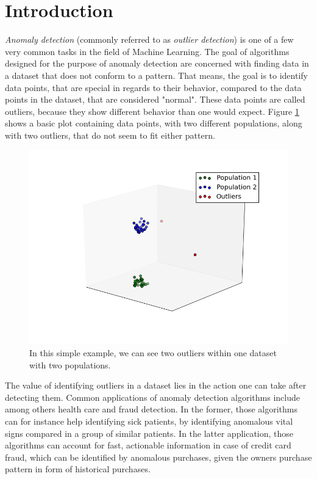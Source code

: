 \documentclass{vldb}
\begin{document}
\section{Introduction}
\label{sec:Introduction}
\textit{Anomaly detection} (commonly referred to as \textit{outlier detection}) is one of a few very common tasks in the field of Machine Learning. The goal of algorithms designed for the purpose of anomaly detection are concerned with finding data in a dataset that does not conform to a pattern. That means, the goal is to identify data points, that are special in regards to their behavior, compared to the data points in the dataset, that are considered "normal". \cite{survey:anomaly-detection} These data points are called outliers, because they show different behavior than one would expect. Figure \ref{fig:outlier-basic} shows a basic plot containing data points, with two different populations, along with two outliers, that do not seem to fit either pattern.\\
\begin{figure}
\centering
\includegraphics[width=\linewidth]{"pics/outlier_basic"}%
\caption{In this simple example, we can see two outliers within one dataset with two populations. }
\label{fig:outlier-basic}
\end{figure}
The value of identifying outliers in a dataset lies in the action one can take after detecting them. Common applications of anomaly detection algorithms include among others health care and fraud detection. In the former, those algorithms can for instance help identifying sick patients, by identifying anomalous vital signs compared in a group of similar patients. In the latter application, those algorithms can account for fast, actionable information in case of credit card fraud, which can be identified by anomalous purchases, given the owners purchase pattern in form of historical purchases. \\
\end{document}

